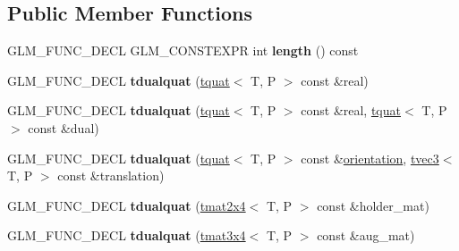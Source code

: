 \subsection*{Public Member Functions}
\begin{DoxyCompactItemize}
\item 
G\+L\+M\+\_\+\+F\+U\+N\+C\+\_\+\+D\+E\+CL G\+L\+M\+\_\+\+C\+O\+N\+S\+T\+E\+X\+PR int {\bfseries length} () const \hypertarget{structglm_1_1detail_1_1tdualquat_a002ccdb011d5b6e79f613388e83f3f43}{}\label{structglm_1_1detail_1_1tdualquat_a002ccdb011d5b6e79f613388e83f3f43}

\item 
G\+L\+M\+\_\+\+F\+U\+N\+C\+\_\+\+D\+E\+CL {\bfseries tdualquat} (\hyperlink{structglm_1_1detail_1_1tquat}{tquat}$<$ T, P $>$ const \&real)\hypertarget{structglm_1_1detail_1_1tdualquat_a4a3b8676710dc0dd69e03b7e5fa2fd46}{}\label{structglm_1_1detail_1_1tdualquat_a4a3b8676710dc0dd69e03b7e5fa2fd46}

\item 
G\+L\+M\+\_\+\+F\+U\+N\+C\+\_\+\+D\+E\+CL {\bfseries tdualquat} (\hyperlink{structglm_1_1detail_1_1tquat}{tquat}$<$ T, P $>$ const \&real, \hyperlink{structglm_1_1detail_1_1tquat}{tquat}$<$ T, P $>$ const \&dual)\hypertarget{structglm_1_1detail_1_1tdualquat_a3ba0cb0502e788715bd1b28547faaf78}{}\label{structglm_1_1detail_1_1tdualquat_a3ba0cb0502e788715bd1b28547faaf78}

\item 
G\+L\+M\+\_\+\+F\+U\+N\+C\+\_\+\+D\+E\+CL {\bfseries tdualquat} (\hyperlink{structglm_1_1detail_1_1tquat}{tquat}$<$ T, P $>$ const \&\hyperlink{group__gtx__rotate__vector_gac80aaf3b2af70c7f03f1077d4b6ac507}{orientation}, \hyperlink{structglm_1_1detail_1_1tvec3}{tvec3}$<$ T, P $>$ const \&translation)\hypertarget{structglm_1_1detail_1_1tdualquat_abf6379e6f03b8fd76ae490434893286a}{}\label{structglm_1_1detail_1_1tdualquat_abf6379e6f03b8fd76ae490434893286a}

\item 
G\+L\+M\+\_\+\+F\+U\+N\+C\+\_\+\+D\+E\+CL {\bfseries tdualquat} (\hyperlink{structglm_1_1detail_1_1tmat2x4}{tmat2x4}$<$ T, P $>$ const \&holder\+\_\+mat)\hypertarget{structglm_1_1detail_1_1tdualquat_a07db5c65293e34b2d0e53c62940db0f8}{}\label{structglm_1_1detail_1_1tdualquat_a07db5c65293e34b2d0e53c62940db0f8}

\item 
G\+L\+M\+\_\+\+F\+U\+N\+C\+\_\+\+D\+E\+CL {\bfseries tdualquat} (\hyperlink{structglm_1_1detail_1_1tmat3x4}{tmat3x4}$<$ T, P $>$ const \&aug\+\_\+mat)\hypertarget{structglm_1_1detail_1_1tdualquat_afd1ddf2aeffe1f900dfbc17507860e89}{}\label{structglm_1_1detail_1_1tdualquat_afd1ddf2aeffe1f900dfbc17507860e89}


\end{DoxyCompactItemize}
